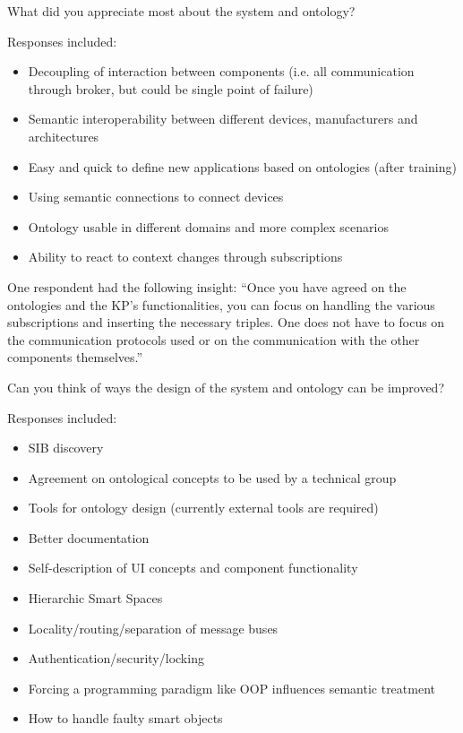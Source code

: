 \begin{cdquestion}
	What did you appreciate most about the system and ontology?
\end{cdquestion}

Responses included:

\begin{itemize}
	\item Decoupling of interaction between components (i.e. all communication through broker, but could be single point of failure)
	\item Semantic interoperability between different devices, manufacturers and architectures
	\item Easy and quick to define new applications based on ontologies (after training)
	\item Using semantic connections to connect devices
	\item Ontology usable in different domains and more complex scenarios
	\item Ability to react to context changes through subscriptions
\end{itemize}


One respondent had the following insight: ``Once you have agreed on the ontologies and the KP's functionalities, you can focus on handling the various subscriptions and inserting the necessary triples. One does not have to focus on the communication protocols used or on the communication with the other components themselves.''\\


\begin{cdquestion}
	Can you think of ways the design of the system and ontology can be improved?
\end{cdquestion}

Responses included:

\begin{itemize}

	\item \ac{SIB} discovery
	\item Agreement on ontological concepts to be used by a technical group
	\item Tools for ontology design (currently external tools are required)
	\item Better documentation
	\item Self-description of UI concepts and component functionality 
	\item Hierarchic Smart Spaces
	\item Locality/routing/separation of message buses
	\item Authentication/security/locking
	\item Forcing a programming paradigm like \ac{OOP} influences semantic treatment
	\item How to handle faulty smart objects
\end{itemize}

